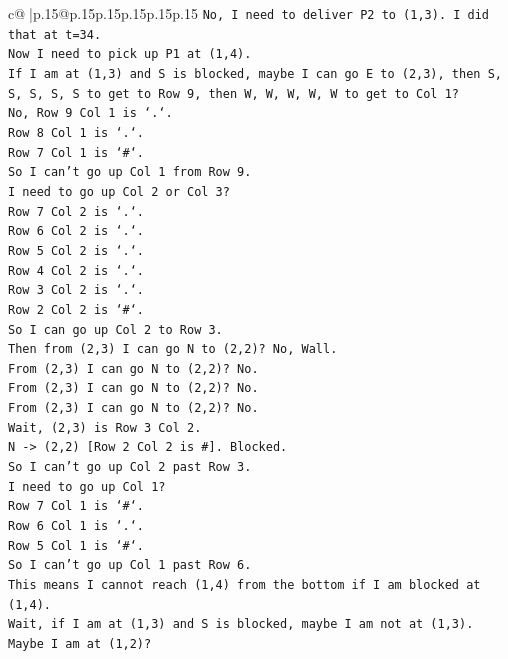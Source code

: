 \documentclass{article}
\begin{document}
{\begin{supertabular}{c@{$\;$}|p{.15\linewidth}@{}p{.15\linewidth}p{.15\linewidth}p{.15\linewidth}p{.15\linewidth}p{.15\linewidth}}
{{{\texttt{No, I need to deliver P2 to (1,3). I did that at t=34.} \\
\texttt{Now I need to pick up P1 at (1,4).} \\
\texttt{If I am at (1,3) and S is blocked, maybe I can go E to (2,3), then S, S, S, S, S to get to Row 9, then W, W, W, W, W to get to Col 1?} \\
\texttt{No, Row 9 Col 1 is `.`.} \\
\texttt{Row 8 Col 1 is `.`.} \\
\texttt{Row 7 Col 1 is `\#`.} \\
\texttt{So I can't go up Col 1 from Row 9.} \\
\texttt{I need to go up Col 2 or Col 3?} \\
\texttt{Row 7 Col 2 is `.`.} \\
\texttt{Row 6 Col 2 is `.`.} \\
\texttt{Row 5 Col 2 is `.`.} \\
\texttt{Row 4 Col 2 is `.`.} \\
\texttt{Row 3 Col 2 is `.`.} \\
\texttt{Row 2 Col 2 is `\#`.} \\
\texttt{So I can go up Col 2 to Row 3.} \\
\texttt{Then from (2,3) I can go N to (2,2)? No, Wall.} \\
\texttt{From (2,3) I can go N to (2,2)? No.} \\
\texttt{From (2,3) I can go N to (2,2)? No.} \\
\texttt{From (2,3) I can go N to (2,2)? No.} \\
\texttt{Wait, (2,3) is Row 3 Col 2.} \\
\texttt{N {-}> (2,2) {[}Row 2 Col 2 is \#{]}. Blocked.} \\
\texttt{So I can't go up Col 2 past Row 3.} \\
\texttt{I need to go up Col 1?} \\
\texttt{Row 7 Col 1 is `\#`.} \\
\texttt{Row 6 Col 1 is `.`.} \\
\texttt{Row 5 Col 1 is `\#`.} \\
\texttt{So I can't go up Col 1 past Row 6.} \\
\texttt{This means I cannot reach (1,4) from the bottom if I am blocked at (1,4).} \\
\texttt{Wait, if I am at (1,3) and S is blocked, maybe I am not at (1,3).} \\
\texttt{Maybe I am at (1,2)?} \\
}}}
\end{supertabular}}
\end{document}

